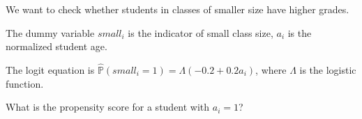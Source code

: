 
\begin{question}
We want to check whether students in classes of smaller size have higher grades.

The dummy variable \(small_i\) is the indicator of small class size, \(a_i\) is the normalized student age.

The logit equation is \(\hat{\mathbb{P}}(small_i = 1) = \Lambda(-0.2 + 0.2 a_i)\), where \(\Lambda\) is the logistic function.

What is the propensity score for a student with \(a_i = 1\)?
\end{question}


